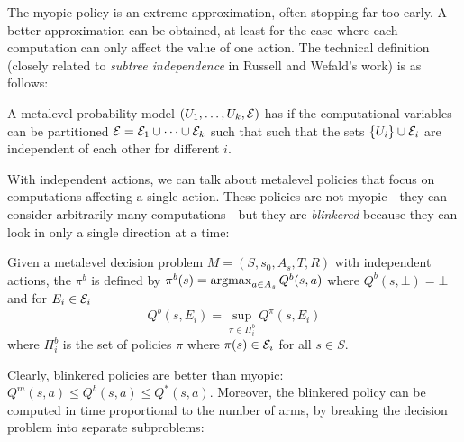 


The myopic policy is an extreme approximation, often stopping far too early.
A better approximation can be obtained, at least for the case where
each computation can only affect the value of one action.
The technical definition (closely related to {\em subtree independence} in Russell and Wefald's work) is
as follows:

\begin{dfn}\label{dfn:independent-actions}
	A metalevel probability model $(U_1,\dots,U_k,\mathcal{E})$ 
	has  if the computational variables can be partitioned 
	$\mathcal{E} = \mathcal{E}_1\cup\dots\cup\mathcal{E}_k$ such that such that
	the sets $\{U_i\}\cup\mathcal{E}_i$ are independent of each other for different $i$.	
\end{dfn}

With independent actions, we can talk about metalevel policies that focus on
computations affecting a single action. These policies are not myopic---they can consider arbitrarily many computations---but they are {\em blinkered} because they can look
in only a single direction at a time:

\begin{dfn}\label{dfn:blinkered}
	Given a metalevel decision problem $M=(S,s_0,A_s,T,R)$ with independent actions,
	the  $\pi^b$ is defined by $\pi^b(s) = \operatorname*{argmax}_{a\in A_s} Q^b(s,a)$ where
	$Q^b(s,\bot) = \bot$ and for $E_i\in\mathcal{E}_i$
	\begin{equation}\label{eq:blinkered}
		Q^b(s,E_i) = \sup_{\pi\in\Pi^b_i} Q^\pi(s,E_i)
	\end{equation}
	where $\Pi^b_i$ is the set of policies $\pi$ where $\pi(s)\in\mathcal{E}_i$ for all $s\in S$.
\end{dfn}

Clearly, blinkered policies are better than myopic: $Q^m(s,a) \le Q^b(s,a) \le Q^*(s,a)$.
Moreover, the blinkered policy can be computed in time proportional to the number of arms, by breaking the
decision problem into separate subproblems:

